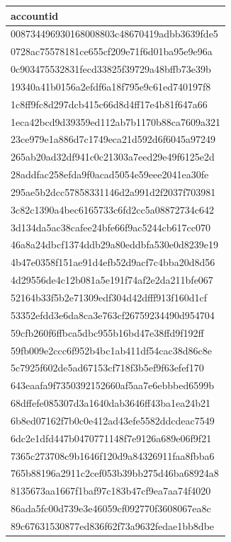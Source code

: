 \begin{tabular}{l}
\toprule
accountid \\
\midrule
008734496930168008803c48670419adbb3639fde5 \\
0728ac75578181ce655cf209e71f6d01ba95e9e96a \\
0c903475532831fecd33825f39729a48bffb73e39b \\
19340a41b0156a2efdf6a18f795e9c61ed740197f8 \\
1c8ff9fc8d297dcb415c66d8d4ff17e4b81f647a66 \\
1eca42bcd9d39359ed112ab7b1170b88ca7609a321 \\
23ce979e1a886d7c1749eca21d592d6f6045a97249 \\
265ab20ad32df941c0c21303a7eed29e49f6125e2d \\
28addfac258efda9f0acad5054e59eee2041ea30fe \\
295ae5b2dcc57858331146d2a991d2f2037f703981 \\
3c82c1390a4bec6165733c6fd2cc5a08872734c642 \\
3d134da5ac38cafee24bfe66f9ac5244cb617cc070 \\
46a8a24dbcf1374ddb29a80eddbfa530e0d8239e19 \\
4b47e0358f151ae91d4efb52d9acf7c4bba20d8d56 \\
4d29556de4c12b081a5e191f74af2e2da211bfe067 \\
52164b33f5b2e71309edf304d42dfff913f160d1cf \\
53352efdd3e6da8ca3e763cf26759234490d954704 \\
59cfb260f6ffbca5dbc955b16bd47e38ffd9f192ff \\
59fb009e2ccc6f952b4bc1ab411df54cac38d86c8e \\
5c7925f602de5ad67153cf718f3b5ef9f63efef170 \\
643eaafa9f7350392152660af5aa7e6ebbbed6599b \\
68dffefe085307d3a1640dab3646ff43ba1ea24b21 \\
6b8ed07162f7b0c0e412ad43efe5582ddcdeac7549 \\
6dc2e1dfd447b0470771148f7e9126a689e06f9f21 \\
7365c273708c9b1646f120d9a84326911faa8fbba6 \\
765b88196a2911c2cef053b39bb275d46ba68924a8 \\
8135673aa1667f1baf97c183b47cf9ea7aa74f4020 \\
86ada5fc00d739e3e46059cf092770f3608067ea8c \\
89c67631530877ed836f62f73a9632fedae1bb8dbe \\

\end{tabular}
